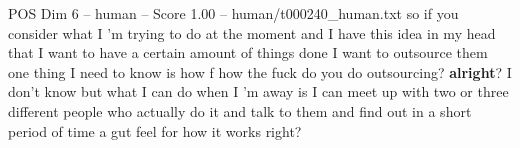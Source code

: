 \begin{textsample}{POS Dim 6 – human – Score 1.00 – human/t000240\_human.txt}  \label{ex:f6_pos_019}
so if you consider what I 'm trying to do at the moment and I have this idea in my head that I want to have a certain amount of things done I want to outsource them one thing I need to know is how f how the fuck do you do outsourcing? \textbf{alright}?
I don't know but what I can do when I 'm away is I can meet up with two or three different people who actually do it and talk to them and find out in a short period of time a gut feel for how it works right?

\end{textsample}
